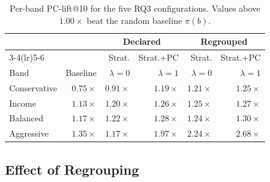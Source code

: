 \begin{table}[!t]
\centering
\footnotesize
\setlength{\tabcolsep}{3pt}
\begin{tabular}{lrrrrr}
\toprule
 & & \multicolumn{2}{c}{Declared} & \multicolumn{2}{c}{Regrouped} \\
\cmidrule(lr){3-4}\cmidrule(lr){5-6}
 & & Strat. & Strat.$+$PC & Strat. & Strat.$+$PC \\
Band & Baseline & $\lambda{=}0$ & $\lambda{=}1$ & $\lambda{=}0$ & $\lambda{=}1$ \\
\midrule
Conservative & $0.75\times$ & $0.91\times$ & $1.19\times$ & $1.21\times$ & $1.25\times$ \\
Income       & $1.13\times$ & $1.20\times$ & $1.26\times$ & $1.25\times$ & $1.27\times$ \\
Balanced     & $1.17\times$ & $1.22\times$ & $1.28\times$ & $1.24\times$ & $1.30\times$ \\
Aggressive   & $1.35\times$ & $1.17\times$ & $1.97\times$ & $2.24\times$ & $2.68\times$ \\
\bottomrule
\end{tabular}
\caption{Per-band PC-lift@10 for the five RQ3 configurations. Values above $1.00\times$ beat the random baseline $\pi(b)$.}
\label{tab:pclgcn-per-band}
\end{table}

\subsection{Effect of Regrouping}
\label{sec:rq3:regroup-results}

